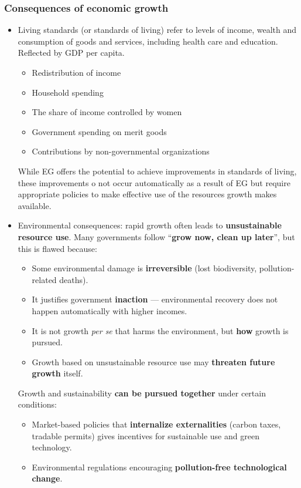 \documentclass[a4paper,12pt]{article}
\begin{document}
\subsubsection*{Consequences of economic growth}
\begin{itemize}
  \item Living standards (or standards of living) refer to levels of income, wealth and consumption of goods and services, including health care and education. Reflected by GDP per capita.
  \begin{itemize}
    \item Redistribution of income
    \item Household spending
    \item The share of income controlled by women
    \item Government spending on merit goods
    \item Contributions by non-governmental organizations
  \end{itemize}
  While EG offers the potential to achieve improvements in standards of living, these improvements o not occur automatically as a result of EG but require appropriate policies to make effective use of the resources growth makes available.
  \item Environmental consequences: rapid growth often leads to \textbf{unsustainable resource use}. Many governments follow ``\textbf{grow now, clean up later}'', but this is flawed because:
\begin{itemize}
  \item Some environmental damage is \textbf{irreversible} (lost biodiversity, pollution-related deaths).
  \item It justifies government \textbf{inaction} --- environmental recovery does not happen automatically with higher incomes.
  \item It is not growth \textit{per se} that harms the environment, but \textbf{how} growth is pursued.
  \item Growth based on unsustainable resource use may \textbf{threaten future growth} itself.
\end{itemize}
Growth and sustainability \textbf{can be pursued together} under certain conditions:
\begin{itemize}
  \item Market-based policies that \textbf{internalize externalities} (carbon taxes, tradable permits) gives incentives for sustainable use and green technology.
  \item Environmental regulations encouraging \textbf{pollution-free technological change}.

\end{itemize}
\end{itemize}
\end{document}

